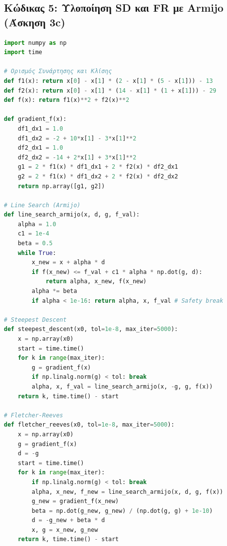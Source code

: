 \documentclass[a4paper,12pt]{article}
\begin{document}
\subsection*{Κώδικας 5: Υλοποίηση SD και FR με Armijo (Άσκηση 3c)}
\begin{lstlisting}[language=Python]
import numpy as np
import time

# Ορισμός Συνάρτησης και Κλίσης
def f1(x): return x[0] - x[1] * (2 - x[1] * (5 - x[1])) - 13
def f2(x): return x[0] - x[1] * (14 - x[1] * (1 + x[1])) - 29
def f(x): return f1(x)**2 + f2(x)**2

def gradient_f(x):
    df1_dx1 = 1.0
    df1_dx2 = -2 + 10*x[1] - 3*x[1]**2
    df2_dx1 = 1.0
    df2_dx2 = -14 + 2*x[1] + 3*x[1]**2
    g1 = 2 * f1(x) * df1_dx1 + 2 * f2(x) * df2_dx1
    g2 = 2 * f1(x) * df1_dx2 + 2 * f2(x) * df2_dx2
    return np.array([g1, g2])

# Line Search (Armijo)
def line_search_armijo(x, d, g, f_val):
    alpha = 1.0
    c1 = 1e-4
    beta = 0.5
    while True:
        x_new = x + alpha * d
        if f(x_new) <= f_val + c1 * alpha * np.dot(g, d):
            return alpha, x_new, f(x_new)
        alpha *= beta
        if alpha < 1e-16: return alpha, x, f_val # Safety break

# Steepest Descent
def steepest_descent(x0, tol=1e-8, max_iter=5000):
    x = np.array(x0)
    start = time.time()
    for k in range(max_iter):
        g = gradient_f(x)
        if np.linalg.norm(g) < tol: break
        alpha, x, f_val = line_search_armijo(x, -g, g, f(x))
    return k, time.time() - start

# Fletcher-Reeves
def fletcher_reeves(x0, tol=1e-8, max_iter=5000):
    x = np.array(x0)
    g = gradient_f(x)
    d = -g
    start = time.time()
    for k in range(max_iter):
        if np.linalg.norm(g) < tol: break
        alpha, x_new, f_new = line_search_armijo(x, d, g, f(x))
        g_new = gradient_f(x_new)
        beta = np.dot(g_new, g_new) / (np.dot(g, g) + 1e-10)
        d = -g_new + beta * d
        x, g = x_new, g_new
    return k, time.time() - start
\end{lstlisting}
\end{document}
